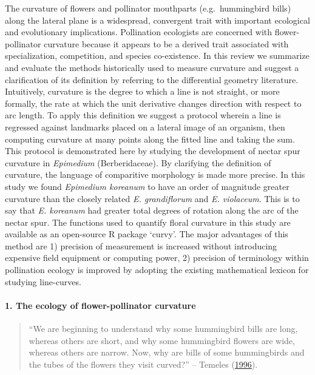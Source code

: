 \documentclass[]{article}
\let\oldparagraph\paragraph
\renewcommand{\paragraph}[1]{\oldparagraph{#1}\mbox{}}
\begin{document}
The curvature of flowers and pollinator mouthparts (e.g.~hummingbird
bills) along the lateral plane is a widespread, convergent trait with
important ecological and evolutionary implications. Pollination
ecologists are concerned with flower-pollinator curvature because it
appears to be a derived trait associated with specialization,
competition, and species co-existence. In this review we summarize and
evaluate the methods historically used to measure curvature and suggest
a clarification of its definition by referring to the differential
geometry literature. Intuitively, curvature is the degree to which a
line is not straight, or more formally, the rate at which the unit
derivative changes direction with respect to arc length. To apply this
definition we suggest a protocol wherein a line is regressed against
landmarks placed on a lateral image of an organism, then computing
curvature at many points along the fitted line and taking the sum. This
protocol is demonstrated here by studying the development of nectar spur
curvature in \emph{Epimedium} (Berberidaceae). By clarifying the
definition of curvature, the language of comparitive morphology is made
more precise. In this study we found \emph{Epimedium koreanum} to have
an order of magnitude greater curvature than the closely related
\emph{E. grandiflorum} and \emph{E. violaceum}. This is to say that
\emph{E. koreanum} had greater total degrees of rotation along the arc
of the nectar spur. The functions used to quantify floral curvature in
this study are available as an open-source R package `curvy'. The major
advantages of this method are 1) precision of measurement is increased
without introducing expensive field equipment or computing power, 2)
precision of terminology within pollination ecology is improved by
adopting the existing mathematical lexicon for studying line-curves.

\hypertarget{the-ecology-of-flower-pollinator-curvature}{%
\paragraph{1. The ecology of flower-pollinator
curvature}\label{the-ecology-of-flower-pollinator-curvature}}

\begin{quote}
``We are beginning to understand why some hummingbird bills are long,
whereas others are short, and why some hummingbird flowers are wide,
whereas others are narrow. Now, why are bills of some hummingbirds and
the tubes of the flowers they visit curved?'' -- Temeles
(\protect\hyperlink{ref-temeles_1996}{1996}).
\end{quote}
\end{document}
